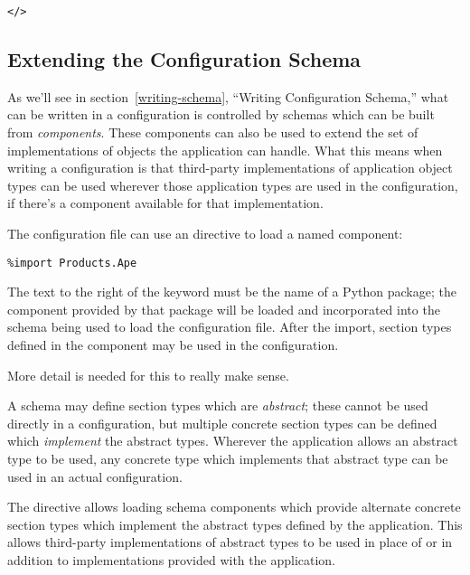 \documentclass{howto}
\begin{document}
\begin{alltt}
<  />
\end{alltt}


\subsection{Extending the Configuration Schema}

As we'll see in section~\ref{writing-schema}, ``Writing Configuration
Schema,'' what can be written in a configuration is controlled by
schemas which can be built from \emph{components}.  These components
can also be used to extend the set of implementations of objects the
application can handle.  What this means when writing a configuration
is that third-party implementations of application object types can be
used wherever those application types are used in the configuration,
if there's a  component available for that
implementation.

The configuration file can use an  directive to load
a named component:

\begin{verbatim}
%import Products.Ape
\end{verbatim}

The text to the right of the  keyword must be the
name of a Python package; the  component provided by
that package will be loaded and incorporated into the schema being
used to load the configuration file.  After the import, section types
defined in the component may be used in the configuration.

More detail is needed for this to really make sense.

A schema may define section types which are \emph{abstract}; these
cannot be used directly in a configuration, but multiple concrete
section types can be defined which \emph{implement} the abstract
types.  Wherever the application allows an abstract type to be used,
any concrete type which implements that abstract type can be used in
an actual configuration.

The  directive allows loading schema components
which provide alternate concrete section types which implement the
abstract types defined by the application.  This allows third-party
implementations of abstract types to be used in place of or in
addition to implementations provided with the application.
\end{document}
